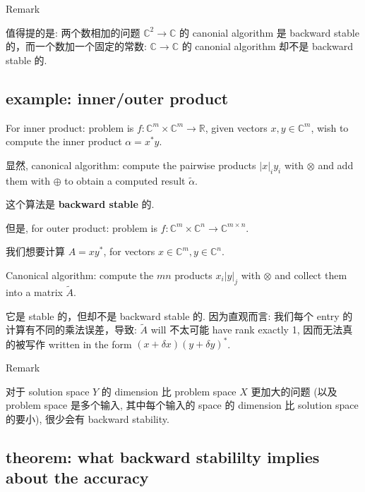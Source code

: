 \begin{qlremark}{Remark}

值得提的是: 两个数相加的问题 \(\mathbb{C}^{2}\rightarrow\mathbb{C}\) 的 canonial algorithm 是 backward stable 的，而一个数加一个固定的常数: \(\mathbb{C}\rightarrow\mathbb{C}\) 的 canonial algorithm 却不是 backward stable 的.

\end{qlremark}

\subsection{example: inner/outer product}

For inner product: problem is \(f:\mathbb{C}^{m} \times \mathbb{C}^{m}\rightarrow\mathbb{R}\), given vectors \(x,y \in \mathbb{C}^{m}\), wish to compute the inner product \(\alpha = x^{\ast}y\).

显然, canonical algorithm: compute the pairwise products \(|x|_{i}y_{i}\) with \(\otimes\) and add them with \(\oplus\) to obtain a computed result \(\widetilde{\alpha}\).

这个算法是 \textbf{backward stable} 的.

但是, for outer product: problem is \(f:\mathbb{C}^{m} \times \mathbb{C}^{n}\rightarrow\mathbb{C}^{m \times n}\).

我们想要计算 \(A = xy^{\ast}\), for vectors \(x \in \mathbb{C}^{m},y \in \mathbb{C}^{n}\).

Canonical algorithm: compute the \(mn\) products \(x_{i}|y|_{j}\) with \(\otimes\) and collect them into a matrix \(\widetilde{A}\).

它是 stable 的，但却不是 backward stable 的. 因为直观而言: 我们每个 entry 的计算有不同的乘法误差，导致: \(\widetilde{A}\) will 不太可能 have rank exactly 1, 因而无法真的被写作 written in the form \(\left( {x + \delta x} \right)\left( {y + \delta y} \right)^{\ast}\).

\begin{qlremark}{Remark}

对于 solution space \(Y\) 的 dimension 比 problem space \(X\) 更加大的问题 (以及 problem space 是多个输入, 其中每个输入的 space 的 dimension 比 solution space 的要小), 很少会有 backward stability.

\end{qlremark}

\subsection{theorem: what backward stabililty implies about the accuracy}

